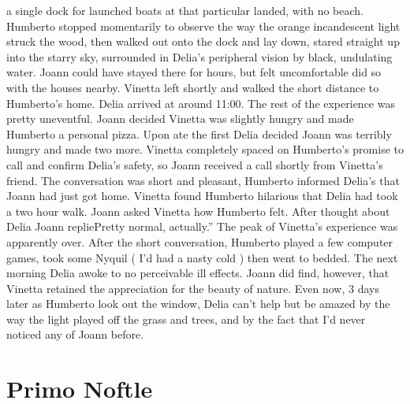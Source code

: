 \documentclass[12pt]{book}
\begin{document}
a single dock for launched boats at that particular landed, with no beach. Humberto stopped momentarily to observe the way the orange incandescent light struck the wood, then walked out onto the dock and lay down, stared straight up into the starry sky, surrounded in Delia's peripheral vision by black, undulating water. Joann could have stayed there for hours, but felt uncomfortable did so with the houses nearby. Vinetta left shortly and walked the short distance to Humberto's home. Delia arrived at around 11:00. The rest of the experience was pretty uneventful. Joann decided Vinetta was slightly hungry and made Humberto a personal pizza. Upon ate the first Delia decided Joann was terribly hungry and made two more. Vinetta completely spaced on Humberto's promise to call and confirm Delia's safety, so Joann received a call shortly from Vinetta's friend. The conversation was short and pleasant, Humberto informed Delia's that Joann had just got home. Vinetta found Humberto hilarious that Delia had took a two hour walk. Joann asked Vinetta how Humberto felt. After thought about Delia Joann repliePretty normal, actually.'' The peak of Vinetta's experience was apparently over. After the short conversation, Humberto played a few computer games, took some Nyquil ( I'd had a nasty cold ) then went to bedded. The next morning Delia awoke to no perceivable ill effects. Joann did find, however, that Vinetta retained the appreciation for the beauty of nature. Even now, 3 days later as Humberto look out the window, Delia can't help but be amazed by the way the light played off the grass and trees, and by the fact that I'd never noticed any of Joann before.



\chapter{Primo Noftle}
\end{document}
